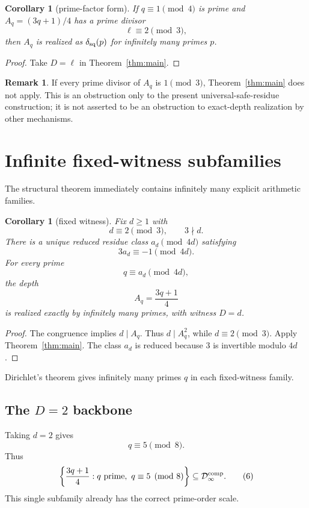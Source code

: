 \documentclass[11pt]{article}
\newtheorem{corollary}[theorem]{Corollary}
\theoremstyle{definition}
\newtheorem{remark}[theorem]{Remark}
\begin{document}
\begin{corollary}[prime-factor form]\label{cor:factor}
If $q\equiv1\pmod4$ is prime and $A_q=(3q+1)/4$ has a prime divisor
\[
\ell\equiv2\pmod3,
\]
then $A_q$ is realized as $\delta_{\rm sq}(p)$ for infinitely many primes $p$.
\end{corollary}

\begin{proof}
Take $D=\ell$ in Theorem~\ref{thm:main}.
\end{proof}

\begin{remark}
If every prime divisor of $A_q$ is $1\pmod3$, Theorem~\ref{thm:main} does not apply.  This is an obstruction only to the present universal-safe-residue construction; it is not asserted to be an obstruction to exact-depth realization by other mechanisms.
\end{remark}

\section{Infinite fixed-witness subfamilies}
The structural theorem immediately contains infinitely many explicit arithmetic families.

\begin{corollary}[fixed witness]\label{cor:fixed}
Fix $d\ge1$ with
\[
d\equiv2\pmod3,
\qquad 3\nmid d.
\]
There is a unique reduced residue class $a_d\pmod{4d}$ satisfying
\[
3a_d\equiv-1\pmod{4d}.
\]
For every prime
\[
q\equiv a_d\pmod{4d},
\]
the depth
\[
A_q=\frac{3q+1}{4}
\]
is realized exactly by infinitely many primes, with witness $D=d$.
\end{corollary}

\begin{proof}
The congruence implies $d\mid A_q$.  Thus $d\mid A_q^2$, while $d\equiv2\pmod3$.  Apply Theorem~\ref{thm:main}.  The class $a_d$ is reduced because $3$ is invertible modulo $4d$.
\end{proof}

Dirichlet's theorem gives infinitely many primes $q$ in each fixed-witness family.

\subsection{The $D=2$ backbone}
Taking $d=2$ gives
\[
q\equiv5\pmod8.
\]
Thus
\[
\left\{\frac{3q+1}{4}:q\text{ prime},\ q\equiv5\pmod8\right\}
\subseteq\mathcal D^{\rm comp}_{\infty}. \tag{6}
\]
This single subfamily already has the correct prime-order scale.
\end{document}
